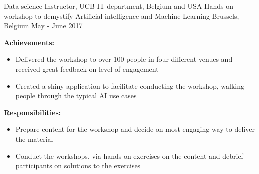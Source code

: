 \begin{cventries}
    \cventry
    {Data science Instructor, UCB IT department, Belgium and USA} %
    {Hands-on workshop to demystify Artificial intelligence and Machine Learning} %
    {Brussels, Belgium} %
    {May - June 2017} %
    {
        \begin{cvitems}
        \item {\underline{\textbf{Achievements:}}}
            \begin{itemize}
                \item Delivered the workshop to over 100 people in four different venues and received great feedback on level of engagement
                \item Created a shiny application to facilitate conducting the workshop, walking people through the typical AI use cases
            \end{itemize}
        \item {\underline{\textbf{Responsibilities:}}}
            \begin{itemize}
                \item {Prepare content for the workshop and decide on most engaging way to deliver the material}
                \item {Conduct the workshops, via hands on exercises on the content and debrief participants on solutions to the exercises}
            \end{itemize}
    \end{cvitems}
    }

\end{cventries}

